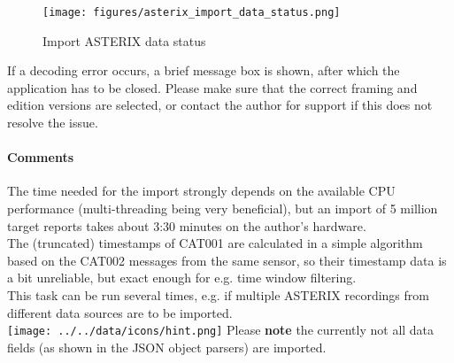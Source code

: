 \begin{figure}[H]
  \center
    \texttt{[image: figures/asterix\_import\_data\_status.png]}
  \caption{Import ASTERIX data status}
\end{figure}

If a decoding error occurs, a brief message box is shown, after which the application has to be closed. 
Please make sure that the correct framing and edition versions are selected, or contact the author for support if this does not resolve the issue. \\


\paragraph{Comments}
The time needed for the import strongly depends on the available CPU performance (multi-threading being very beneficial), but an import of 5 million target reports takes about 3:30 minutes on the author's hardware. \\

The (truncated) timestamps of CAT001 are calculated in a simple algorithm based on the CAT002 messages from the same sensor, so their timestamp data is a bit unreliable, but exact enough for e.g. time window filtering. \\

This task can be run several times, e.g. if multiple ASTERIX recordings from different data sources are to be imported. \\

\texttt{[image: ../../data/icons/hint.png]} Please \textbf{note} the currently not all data fields (as shown in the JSON object parsers) are imported.\\


